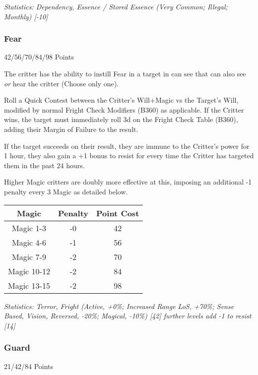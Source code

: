 \begin{multicols*}{3}
 	\textcolor{OliveGreen}{\textit{Statistics: Dependency, Essence / Stored Essence (Very Common; Illegal; Monthly) [-10] }}
	
	\subsubsection{Fear}\label{fear}
	\begin{flushright}
		42/56/70/84/98 Points
	\end{flushright}
	
	The critter has the ability to instill Fear in a target in can see that can also see \textit{or} hear the critter (Choose only one). 
	
	Roll a Quick Contest between the Critter's Will+Magic vs the Target's Will, modified by normal Fright Check Modifiers (B360) as applicable. If the Critter wins, the target must immediately roll 3d on the Fright Check Table (B360), adding their Margin of Failure to the result.
	
	If the target succeeds on their result, they are immune to the Critter's power for 1 hour, they also gain a +1 bonus to resist for every time the Critter has targeted them in the past 24 hours.
	
	Higher Magic critters are doubly more effective at this, imposing an additional -1 penalty every 3 Magic as detailed below.
	
	\begin{center}
		\begin{tabular}{|c|c|c|}
			\hline
			Magic & Penalty & Point Cost\\
			\hline
			\hline
			Magic 1-3 & -0 & 42 \\
			Magic 4-6 & -1 & 56 \\
			Magic 7-9 & -2 & 70 \\
			Magic 10-12 & -2 & 84 \\
			Magic 13-15 & -2 & 98 \\
			\hline
		\end{tabular}
	\end{center}
	
	\textcolor{OliveGreen}{\textit{Statistics: Terror, Fright (Active, +0\%; Increased Range LoS, +70\%; Sense Based, Vision, Reversed, -20\%; Magical, -10\%) [42] further levels add -1 to resist [14]
	}}
	
	
	\subsubsection{Guard}\label{guard}
	\begin{flushright}
		21/42/84 Points
	\end{flushright}
	

\end{multicols*}
